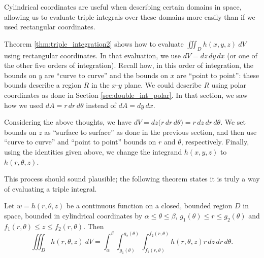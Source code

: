 Cylindrical coordinates are useful when describing certain domains in space, allowing us to evaluate triple integrals over these domains more easily than if we used rectangular coordinates.

Theorem \ref{thm:triple_integration2} shows how to evaluate $\iiint_Dh(x,y,z)\ dV$ using rectangular coordinates. In that evaluation, we use $dV = dz\,dy\,dx$ (or one of the other five orders of integration). Recall how, in this order of integration, the bounds on $y$ are ``curve to curve'' and the bounds on $x$ are ``point to point'': these bounds describe a region $R$ in the $x$-$y$ plane. We could describe $R$ using polar coordinates as done in Section \ref{sec:double_int_polar}. In that section, we saw how we used $dA = r\,dr\,d\theta$ instead of $dA = dy\,dx$. 

Considering the above thoughts, we have $dV = dz\big(r\,dr\,d\theta\big) = r\,dz\,dr\,d\theta$. We set bounds on $z$ as ``surface to surface'' as done in the previous section, and then use ``curve to curve'' and ``point to point'' bounds on $r$ and $\theta$, respectively. Finally, using the identities given above, we change the integrand $h(x,y,z)$ to $h(r,\theta,z)$.

This process should sound plausible; the following theorem states it is truly a way of evaluating a triple integral.

{%
Let $w=h(r,\theta,z)$ be a continuous function on a closed, bounded region $D$ in space, bounded in cylindrical coordinates by $\alpha \leq \theta \leq \beta$, $g_1(\theta)\leq r \leq g_2(\theta)$ and $f_1(r,\theta) \leq z \leq f_2(r,\theta)$. Then  
\[
\iiint_D h(r,\theta,z)\ dV = \int_\alpha^\beta\int_{g_1(\theta)}^{g_2(\theta)}\int_{f_1(r,\theta)}^{f_2(r,\theta)}h(r,\theta,z) r\,dz\,dr\,d\theta.
\]
}

